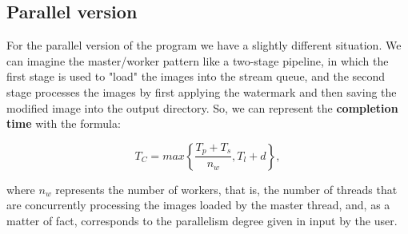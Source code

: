         \subsection{Parallel version} %
        \label{sub:parallel_version}
            For the parallel version of the program we have a slightly different situation. We can imagine the
            master/worker pattern like a two-stage pipeline, in which the first stage is used to "load" the images
            into the stream queue, and the second stage processes the images by first applying the watermark and
            then saving the modified image into the output directory. So, we can represent the
            \textbf{completion time} with the formula:

            \begin{equation}
                T_C = \mathit{max} \left \{ \frac{T_p + T_s}{n_w}, T_l + d \right \},
                \label{eq:completion_time_parallel}
            \end{equation}

            where $n_w$ represents the number of workers, that is, the number of threads that are concurrently
            processing the images loaded by the master thread, and, as a matter of fact, corresponds to the
            parallelism degree given in input by the user.

